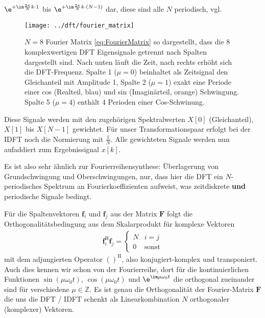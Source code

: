 $\e^{+\im\frac{2\pi}{N}k \cdot 1}$ bis $\e^{+\im\frac{2\pi}{N}k \cdot (N-1)}$
dar, diese sind alle $N$ periodisch, vgl.~
%
\begin{figure}
\centering
\texttt{[image: ../dft/fourier\_matrix]}
\caption{$N=8$ Fourier Matrix \eqref{eq:FourierMatrix} so dargestellt, dass
die 8 komplexwertigen DFT Eigensignale getrennt nach Spalten dargestellt sind.
Nach unten läuft die Zeit, nach rechts erhöht sich die DFT-Frequenz.
Spalte 1 ($\mu=0$) beinhaltet als Zeitsignal den Gleichanteil mit Amplitude 1,
Spalte 2 ($\mu=1$) exakt eine Periode einer cos (Realteil, blau) und sin (Imaginärteil, orange)
Schwingung. Spalte 5 ($\mu=4$) enthält 4 Perioden einer Cos-Schwinung.}
\label{fig:fourier_matrix}
\end{figure}


Diese Signale werden mit den zugehörigen Spektralwerten
$X[0]$ (Gleichanteil), $X[1]$ bis $X[N-1]$ gewichtet.
Für unser Transformationspaar erfolgt bei der IDFT noch die Normierung mit
$\frac{1}{N}$. Alle gewichteten Signale werden nun aufaddiert zum Ergebnissignal
$x[k]$.

Es ist also sehr ähnlich zur Fourierreihensynthese: Überlagerung von
Grundschwingung und Oberschwingungen, nur, dass hier die DFT ein $N$-periodisches
Spektrum an Fourierkoeffizienten aufweist, was zeitdiskrete \textbf{und}
periodische Signale bedingt.
%

Für die Spaltenvektoren $\bm{f}_i$ und $\bm{f}_j$ aus der Matrix $\bm{F}$
folgt die Orthogonalitätsbedingung aus dem Skalarprodukt für komplexe Vektoren
\begin{align}
\bm{f}_i^\mathrm{H} \bm{f}_j =
\begin{cases}
N & i=j\\
0 & \text{sonst}
\end{cases}
\end{align}
mit dem adjungierten Operator $()^\mathrm{H}$, also konjugiert-komplex und transponiert.
Auch dies kennen wir schon von der Fourierreihe, dort für die kontinuierlichen
Funktionen
$\sin(\mu \omega_0 t)$, $\cos(\mu \omega_0 t)$ und $\e^{\im \mu \omega_0 t}$ die
orthogonal zueinander sind für verschiedene $\mu\in\mathbb{Z}$.
%
Es ist genau die Orthogonalität der Fourier-Matrix $\bm{F}$ die uns die DFT / IDFT
schenkt als Linearkombination $N$ orthogonaler (komplexer) Vektoren.
%

